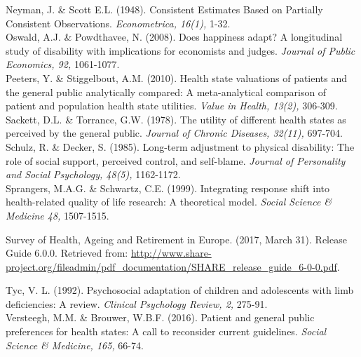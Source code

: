 \documentclass[12pt]{article}
\begin{document}
\noindent Neyman, J. \& Scott E.L. (1948). Consistent Estimates Based on Partially Consistent Observations. \textit{Econometrica, 16(1),} 1-32.\\

\noindent Oswald, A.J. \& Powdthavee, N. (2008). Does happiness adapt? A longitudinal study of disability with implications for economists and judges. \textit{Journal of Public Economics, 92,} 1061-1077.\\

\noindent Peeters, Y. \& Stiggelbout, A.M. (2010). Health state valuations of patients and the general public analytically compared: A meta-analytical comparison of patient and population health state utilities. \textit{Value in Health, 13(2),} 306-309.\\ 

\noindent Sackett, D.L. \& Torrance, G.W. (1978). The utility of different health states as perceived by the general public. \textit{Journal of Chronic Diseases, 32(11),} 697-704.\\

\noindent Schulz, R. \& Decker, S. (1985). Long-term adjustment to physical disability: The role of social support, perceived control, and self-blame. \textit{Journal of Personality and Social Psychology, 48(5),} 1162-1172.\\ 

\noindent Sprangers, M.A.G. \& Schwartz, C.E. (1999). Integrating response shift into health-related quality of life research: A theoretical model. \textit{Social Science \& Medicine 48,} 1507-1515.\\

\begin{sloppypar}
    \noindent Survey of Health, Ageing and Retirement in Europe. (2017, March 31). Release Guide 6.0.0. Retrieved from: 
    \url{http://www.share-project.org/fileadmin/pdf_documentation/SHARE_release_guide_6-0-0.pdf}.\\
\end{sloppypar}

\noindent Tyc, V. L. (1992). Psychosocial adaptation of children and adolescents with limb deficiencies: A review. \textit{Clinical Psychology Review, 2,} 275-91.\\

\noindent Versteegh, M.M. \& Brouwer, W.B.F. (2016). Patient and general public preferences for health states: A call to reconsider current guidelines. \textit{Social Science \& Medicine, 165,} 66-74.\\
\end{document}

